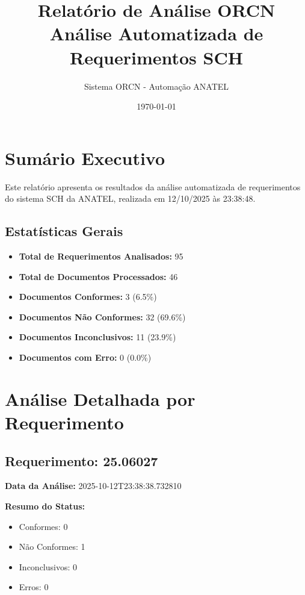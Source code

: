 \documentclass[12pt,a4paper]{article}
\title{\Huge\textbf{Relatório de Análise ORCN}\\
\Large Análise Automatizada de Requerimentos SCH}
\author{Sistema ORCN - Automação ANATEL}
\date{\today}
\begin{document}
\maketitle
\newpage

\tableofcontents
\newpage

\section{Sum\'ario Executivo}

Este relat\'orio apresenta os resultados da an\'alise automatizada de requerimentos do sistema SCH da ANATEL, 
realizada em 12/10/2025 às 23:38:48.

\subsection{Estat\'isticas Gerais}

\begin{itemize}
    \item \textbf{Total de Requerimentos Analisados:} 95
    \item \textbf{Total de Documentos Processados:} 46
    \item \textbf{Documentos Conformes:} 3 (6.5\%)
    \item \textbf{Documentos N\~ao Conformes:} 32 (69.6\%)
    \item \textbf{Documentos Inconclusivos:} 11 (23.9\%)
    \item \textbf{Documentos com Erro:} 0 (0.0\%)
\end{itemize}

\newpage

\section{An\'alise Detalhada por Requerimento}


\subsection{Requerimento: 25.06027}

\textbf{Data da Análise:} 2025-10-12T23:38:38.732810

\textbf{Resumo do Status:}
\begin{itemize}
    \item Conformes: 0
    \item Não Conformes: 1
    \item Inconclusivos: 0
    \item Erros: 0
\end{itemize}
\end{document}
